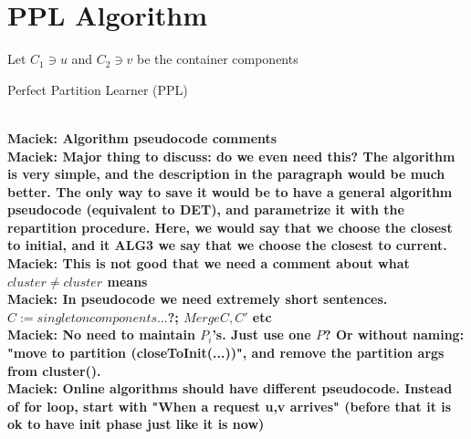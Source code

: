\documentclass[manuscript,screen=true, review, anonymous]{acmart}
\newcommand{\PPL}{\textsf{PPL}\xspace}
\DeclarePairedDelimiter\set{\{}{\}}
\newcommand\maciek[1]{\color{brown}\textbf{\\ Maciek: #1}\color{black}}
\begin{document}
\section{PPL Algorithm} \label{alg:PPL}
\begin{algorithm}
	\renewcommand{\algorithmicrequire}{\textbf{Input:}}
	\renewcommand{\algorithmicensure}{\textbf{Output:}}
	\begin{algorithmic}
		\label{line:initcomponents}
		\STATE Let $C_1 \ni u$ and $C_2 \ni v$ be the container components
		 \label{line:mergecomponents}
		\label{line:rebalance} 
		\ENDIF
		\ENDIF
		\ENDFOR
	\end{algorithmic}
	\caption{Perfect Partition Learner (\PPL)}
	\label{alg:ppl}
\end{algorithm}


\maciek{Algorithm pseudocode comments}
\maciek{Major thing to discuss: do we even need this? The algorithm is very simple, and the description in the paragraph would be much better. The only way to save it would be to have a general algorithm pseudocode (equivalent to DET), and parametrize it with the repartition procedure. Here, we would say that we choose the closest to initial, and it ALG3 we say that we choose the closest to current.}
\maciek{This is not good that we need a comment about what $cluster \neq cluster$ means}
\maciek{In pseudocode we need extremely short sentences. $C := singleton components ... $?; $Merge C, C'$ etc}
\maciek{No need to maintain $P_i$'s. Just use one $P$? Or without naming: "move to partition (closeToInit(...))", and remove the partition args from cluster().}
\maciek{Online algorithms should have different pseudocode. Instead of for loop, start with "When a request u,v arrives" (before that it is ok to have init phase just like it is now)}
\end{document}
